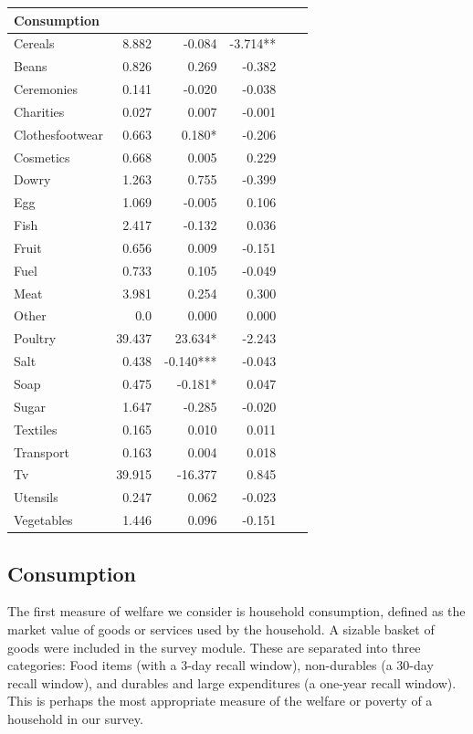 \documentclass[12pt,article]{article}
\begin{document}
\begin{longtable}{lrrrrr}
\hline
Consumption &  &  & \\
\hline
Cereals & 8.882 & -0.084 & -3.714**\\
Beans & 0.826 & 0.269 & -0.382\\
Ceremonies & 0.141 & -0.020 & -0.038\\
Charities & 0.027 & 0.007 & -0.001\\
Clothesfootwear & 0.663 & 0.180* & -0.206\\
Cosmetics & 0.668 & 0.005 & 0.229\\
Dowry & 1.263 & 0.755 & -0.399\\
Egg & 1.069 & -0.005 & 0.106\\
Fish & 2.417 & -0.132 & 0.036\\
Fruit & 0.656 & 0.009 & -0.151\\
Fuel & 0.733 & 0.105 & -0.049\\
Meat & 3.981 & 0.254 & 0.300\\
Other & 0.0 & 0.000 & 0.000\\
Poultry & 39.437 & 23.634* & -2.243\\
Salt & 0.438 & -0.140*** & -0.043\\
Soap & 0.475 & -0.181* & 0.047\\
Sugar & 1.647 & -0.285 & -0.020\\
Textiles & 0.165 & 0.010 & 0.011\\
Transport & 0.163 & 0.004 & 0.018\\
Tv & 39.915 & -16.377 & 0.845\\
Utensils & 0.247 & 0.062 & -0.023\\
Vegetables & 1.446 & 0.096 & -0.151\\
\hline
\end{longtable}

\subsection{Consumption}
\label{sec-3-3}

The first measure of welfare we consider is household consumption, defined as the
market value of goods or services used by the household. A sizable basket of goods
were included in the survey module. These are separated into three categories: Food
items (with a 3-day recall window), non-durables (a 30-day recall window), and
durables and large expenditures (a one-year recall window). This is perhaps the most
appropriate measure of the welfare or poverty of a household in our survey. 
\end{document}

